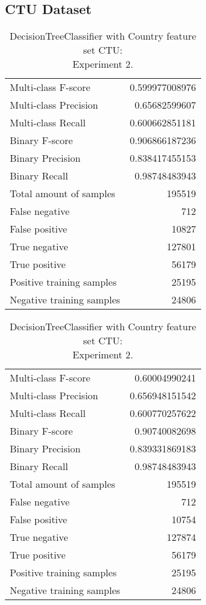 \subsection{CTU Dataset}

\begin{table}[H]
\begin{minipage}{0.5\textwidth}
\caption{DecisionTreeClassifier with Country feature set CTU: \\Experiment 1.}
\centering
\begin{tabular}{l r}
\toprule
Multi-class F-score & 0.599977008976 \\
Multi-class Precision & 0.65682599607 \\
Multi-class Recall & 0.600662851181 \\
\midrule
Binary F-score & 0.906866187236 \\
Binary Precision & 0.838417455153 \\
Binary Recall & 0.98748483943 \\
\midrule
Total amount of samples & 195519 \\
False negative & 712 \\
False positive & 10827 \\
True negative & 127801 \\
True positive & 56179 \\
\midrule
Positive training samples & 25195 \\
Negative training samples & 24806 \\
\bottomrule
\end{tabular}
\end{minipage}
\hfillx
\begin{minipage}{0.5\textwidth}
\caption{DecisionTreeClassifier with Country feature set CTU: \\Experiment 2.}
\centering
\begin{tabular}{l r}
\toprule
Multi-class F-score & 0.60004990241 \\
Multi-class Precision & 0.656948151542 \\
Multi-class Recall & 0.600770257622 \\
\midrule
Binary F-score & 0.90740082698 \\
Binary Precision & 0.839331869183 \\
Binary Recall & 0.98748483943 \\
\midrule
Total amount of samples & 195519 \\
False negative & 712 \\
False positive & 10754 \\
True negative & 127874 \\
True positive & 56179 \\
\midrule
Positive training samples & 25195 \\
Negative training samples & 24806 \\
\bottomrule
\end{tabular}
\end{minipage}
\end{table}

